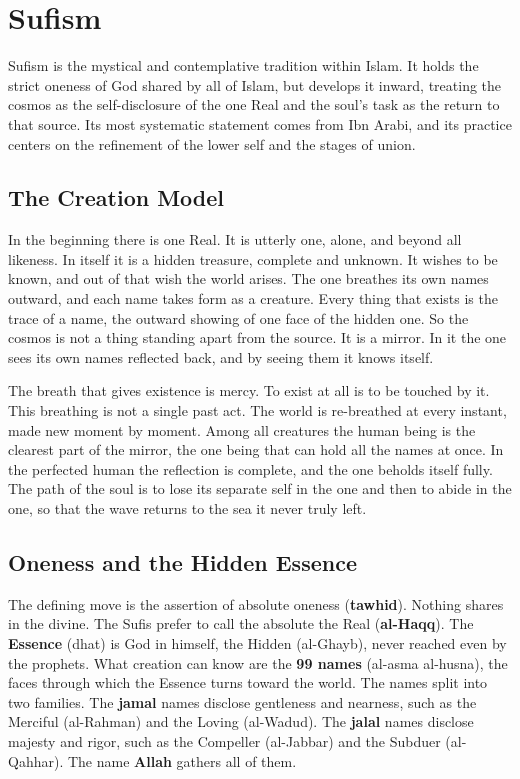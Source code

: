 \section{Sufism}

Sufism is the mystical and contemplative tradition within Islam. It holds the
strict oneness of God shared by all of Islam, but develops it inward, treating
the cosmos as the self-disclosure of the one Real and the soul's task as the
return to that source. Its most systematic statement comes from Ibn Arabi, and
its practice centers on the refinement of the lower self and the stages of union.

\subsection{The Creation Model}

In the beginning there is one Real. It is utterly one, alone, and beyond all
likeness. In itself it is a hidden treasure, complete and unknown. It wishes to
be known, and out of that wish the world arises. The one breathes its own names
outward, and each name takes form as a creature. Every thing that exists is the
trace of a name, the outward showing of one face of the hidden one. So the
cosmos is not a thing standing apart from the source. It is a mirror. In it the
one sees its own names reflected back, and by seeing them it knows itself.

The breath that gives existence is mercy. To exist at all is to be touched by it.
This breathing is not a single past act. The world is re-breathed at every
instant, made new moment by moment. Among all creatures the human being is the
clearest part of the mirror, the one being that can hold all the names at once.
In the perfected human the reflection is complete, and the one beholds itself
fully. The path of the soul is to lose its separate self in the one and then to
abide in the one, so that the wave returns to the sea it never truly left.

\subsection{Oneness and the Hidden Essence}

The defining move is the assertion of absolute oneness (\textbf{tawhid}). Nothing
shares in the divine. The Sufis prefer to call the absolute the Real
(\textbf{al-Haqq}). The \textbf{Essence} (dhat) is God in himself, the Hidden (al-Ghayb),
never reached even by the prophets. What creation can know are the \textbf{99
names} (al-asma al-husna), the faces through which the Essence turns toward the
world. The names split into two families. The \textbf{jamal} names disclose
gentleness and nearness, such as the Merciful (al-Rahman) and the Loving
(al-Wadud). The \textbf{jalal} names disclose majesty and rigor, such as the
Compeller (al-Jabbar) and the Subduer (al-Qahhar). The name \textbf{Allah} gathers
all of them.

